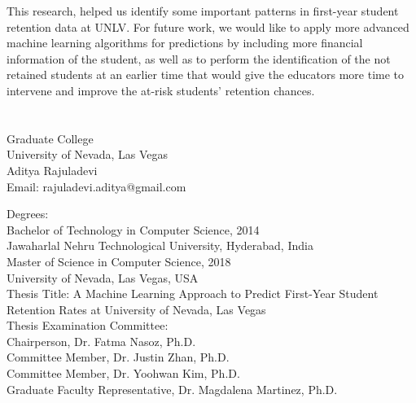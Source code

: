 \documentclass[11pt,openright]{report}
\begin{document}
This research, helped us identify some important patterns in first-year student retention data at UNLV. For future work, we would like to apply more advanced machine learning algorithms for predictions by including more financial information of the student, as well as to perform the identification of the not retained students at an earlier time that would give the educators more time to intervene and improve the at-risk students' retention chances.





\vita
\chapter{} %
\linespread{1.3} 
\begin{center}
Graduate College\\
University of Nevada, Las Vegas\\[1cm]
Aditya Rajuladevi\\[0cm]
Email: rajuladevi.aditya@gmail.com\\[1cm]
\end{center}

\noindent Degrees:\\
\indent Bachelor of Technology in Computer Science, 2014\\
\indent Jawaharlal Nehru Technological University, Hyderabad, India\\
\newline
\indent Master of Science in Computer Science, 2018\\
\indent University of Nevada, Las Vegas, USA\\

\noindent Thesis Title: A Machine Learning Approach to Predict First-Year Student Retention Rates at University of Nevada, Las Vegas\\

\noindent Thesis Examination Committee:\\
\indent Chairperson, Dr. Fatma Nasoz, Ph.D.\\
\indent Committee Member, Dr. Justin Zhan, Ph.D.\\
\indent Committee Member, Dr. Yoohwan Kim, Ph.D.\\
\indent Graduate Faculty Representative, Dr. Magdalena Martinez, Ph.D.\\
\end{document}
